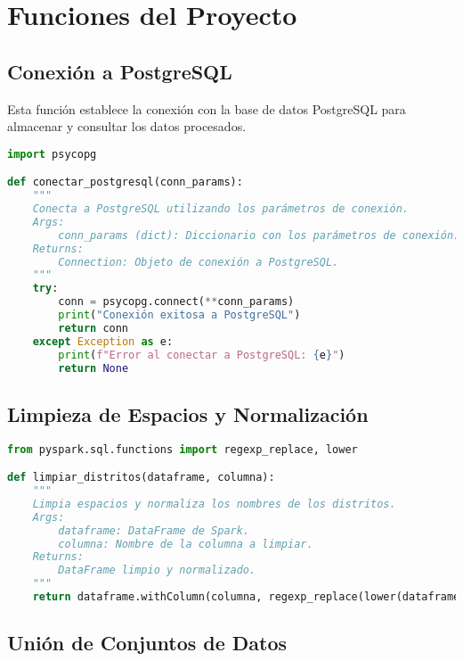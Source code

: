 \documentclass{article}
\begin{document}
\section{Funciones del Proyecto}

\subsection{Conexión a PostgreSQL}

Esta función establece la conexión con la base de datos PostgreSQL para almacenar y consultar los datos procesados.

\begin{lstlisting}[language=Python, caption={Función para establecer conexión con PostgreSQL}]
import psycopg

def conectar_postgresql(conn_params):
    """
    Conecta a PostgreSQL utilizando los parámetros de conexión.
    Args:
        conn_params (dict): Diccionario con los parámetros de conexión.
    Returns:
        Connection: Objeto de conexión a PostgreSQL.
    """
    try:
        conn = psycopg.connect(**conn_params)
        print("Conexión exitosa a PostgreSQL")
        return conn
    except Exception as e:
        print(f"Error al conectar a PostgreSQL: {e}")
        return None
\end{lstlisting}

\subsection{Limpieza de Espacios y Normalización}

\begin{lstlisting}[language=Python, caption={Función para eliminar espacios y normalizar datos}]
from pyspark.sql.functions import regexp_replace, lower

def limpiar_distritos(dataframe, columna):
    """
    Limpia espacios y normaliza los nombres de los distritos.
    Args:
        dataframe: DataFrame de Spark.
        columna: Nombre de la columna a limpiar.
    Returns:
        DataFrame limpio y normalizado.
    """
    return dataframe.withColumn(columna, regexp_replace(lower(dataframe[columna]), " ", ""))
\end{lstlisting}

\subsection{Unión de Conjuntos de Datos}
\end{document}
